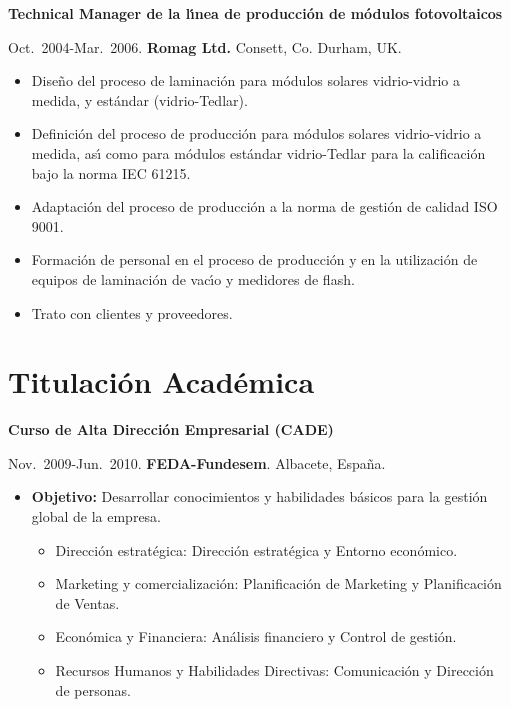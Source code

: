 \documentclass{article}
\begin{document}

{\bf Technical Manager de la l\'{\i}nea de producci\'on de m\'odulos fotovoltaicos}

\medskip
Oct.~2004-Mar.~2006. 
{\bf Romag Ltd.} 
Consett, Co. Durham, UK.

\begin{itemize}\itemsep 0pt
\item Dise\~no del proceso de laminaci\'on para m\'odulos solares vidrio-vidrio a medida, y est\'andar (vidrio-Tedlar).
\item Definici\'on del proceso de producci\'on para m\'odulos solares vidrio-vidrio a medida, as\'{\i} como para m\'odulos est\'andar vidrio-Tedlar para la calificaci\'on bajo la norma IEC 61215.
\item Adaptaci\'on del proceso de producci\'on a la norma de gesti\'on de calidad ISO 9001.
\item Formaci\'on de personal en el proceso de producci\'on y en la utilizaci\'on de equipos de laminaci\'on de vac\'{\i}o y medidores de flash.
\item Trato con clientes y proveedores.
\end{itemize}


\section*{Titulaci\'{o}n Acad\'{e}mica}

{\bf Curso de Alta Direcci\'on Empresarial (CADE)}

\medskip
Nov.~2009-Jun.~2010. {\bf FEDA-Fundesem}. Albacete, Espa\~na.

\begin{itemize}\itemsep 0pt
\item {\bf Objetivo:} Desarrollar conocimientos y habilidades b\'asicos para la gesti\'on global de la empresa.
\begin{itemize} 
\item Direcci\'on estrat\'egica:  Direcci\'on estrat\'egica y Entorno econ\'omico.
\item Marketing y comercializaci\'on:  Planificaci\'on de Marketing y Planificaci\'on de Ventas.
\item Econ\'omica y Financiera:  An\'alisis financiero y Control de gesti\'on.
\item Recursos Humanos y Habilidades Directivas:  Comunicaci\'on y Direcci\'on de personas.
\end{itemize}
\end{itemize}
\end{document}
